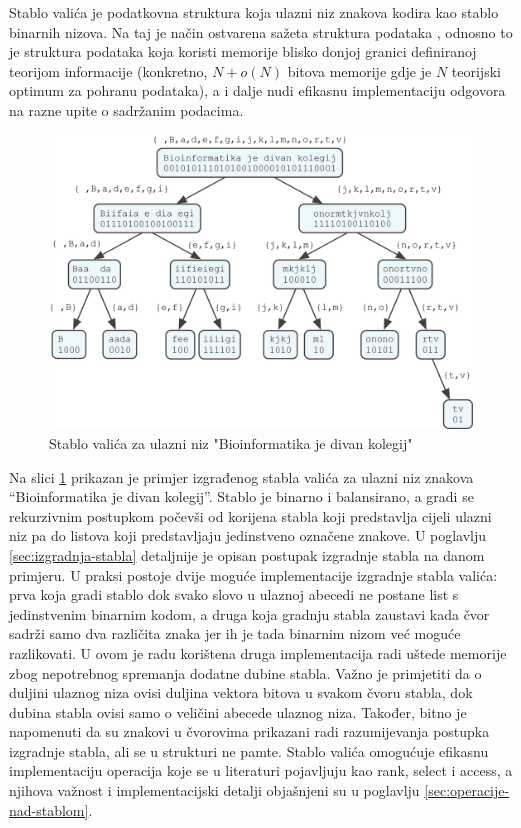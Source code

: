 \documentclass[times, utf8, seminar, numeric]{fer}
\begin{document}
Stablo valića je podatkovna struktura koja ulazni niz znakova kodira kao stablo binarnih nizova. Na taj je način ostvarena sažeta struktura podataka , odnosno to je struktura podataka koja koristi memorije blisko donjoj granici definiranoj teorijom informacije (konkretno, $N + o(N)$ bitova memorije gdje je $N$ teorijski optimum za pohranu podataka), a i dalje nudi efikasnu implementaciju odgovora na razne upite o sadržanim podacima.


\begin{figure}[ht]
	\centering
	\includegraphics[width=\textwidth]{img/wavelet_tree_example.png}
	\caption{Stablo valića za ulazni niz "Bioinformatika je divan kolegij"}
	\label{fig:wavelet-tree-example}
\end{figure}


Na slici \ref{fig:wavelet-tree-example} prikazan je primjer izgrađenog stabla valića za ulazni niz znakova “Bioinformatika je divan kolegij”. Stablo je binarno i balansirano, a gradi se rekurzivnim postupkom počevši od korijena stabla koji predstavlja cijeli ulazni niz pa do listova koji predstavljaju jedinstveno označene znakove. U poglavlju \ref{sec:izgradnja-stabla} detaljnije je opisan postupak izgradnje stabla na danom primjeru. U praksi postoje dvije moguće implementacije izgradnje stabla valića: prva koja gradi stablo dok svako slovo u ulaznoj abecedi ne postane list s jedinstvenim binarnim kodom, a druga koja gradnju stabla zaustavi kada čvor sadrži samo dva različita znaka jer ih je tada binarnim nizom već moguće razlikovati. U ovom je radu korištena druga implementacija radi uštede memorije zbog nepotrebnog spremanja dodatne dubine stabla. Važno je primjetiti da o duljini ulaznog niza ovisi duljina vektora bitova u svakom čvoru stabla, dok dubina stabla ovisi samo o veličini abecede ulaznog niza. Također, bitno je napomenuti da su znakovi u čvorovima prikazani radi razumijevanja postupka izgradnje stabla, ali se u strukturi ne pamte. Stablo valića omogućuje efikasnu implementaciju operacija koje se u literaturi pojavljuju kao rank, select i access, a njihova važnost i implementacijski detalji objašnjeni su u poglavlju \ref{sec:operacije-nad-stablom}.
\end{document}
